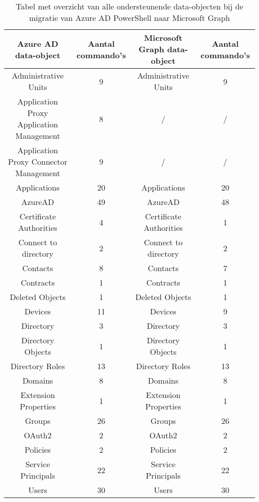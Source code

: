 \begin{table}
    \tiny
    \centering
    \begin{tabular}{ |c|c||c|c| } 
        \hline
        \textbf{Azure AD data-object} & \textbf{Aantal commando's} & \textbf{Microsoft Graph data-object} & \textbf{Aantal commando's} \\
        \hline
        Administrative Units & 9 & Administrative Units & 9 \\ 
        Application Proxy Application Management & 8 & / & / \\
        Application Proxy Connector Management & 9 & / & / \\
        Applications & 20 & Applications & 20 \\ 
        AzureAD & 49 & AzureAD & 48 \\ 
        Certificate Authorities & 4 & Certificate Authorities & 1 \\ 
        Connect to directory & 2 & Connect to directory & 2 \\ 
        Contacts & 8 & Contacts & 7 \\ 
        Contracts & 1 & Contracts & 1 \\ 
        Deleted Objects & 1 & Deleted Objects & 1 \\ 
        Devices & 11 & Devices & 9 \\    
        Directory & 3 & Directory & 3 \\
        Directory Objects & 1 & Directory Objects & 1 \\ 
        Directory Roles & 13 & Directory Roles & 13 \\ 
        Domains & 8 & Domains & 8 \\ 
        Extension Properties & 1 & Extension Properties & 1 \\ 
        Groups & 26 & Groups & 26 \\ 
        OAuth2 & 2 & OAuth2 & 2 \\ 
        Policies & 2 & Policies & 2 \\ 
        Service Principals & 22 & Service Principals & 22 \\ 
        Users & 30 & Users & 30 \\ 
        \hline
    \end{tabular}
    \caption[Tabel migratie Azure AD data-objecten naar Microsoft Graph]{Tabel met overzicht van alle ondersteunende data-objecten bij de migratie van Azure \ac{AD} PowerShell naar Microsoft Graph}
    \label{AADMSG}
\end{table}

